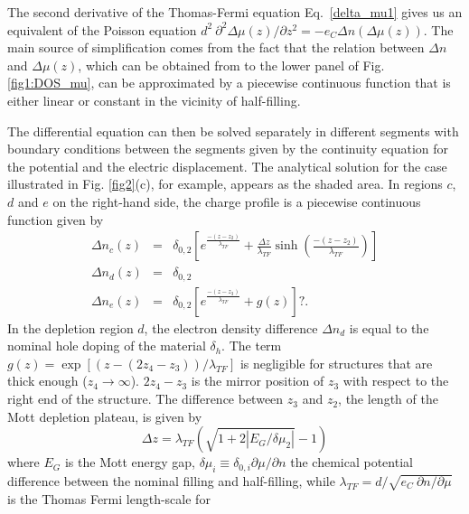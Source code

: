 \documentclass[twocolumn, preprintnumbers,prb,aps,amssymb,showpacs]{revtex4}
\begin{document}
The second derivative of the Thomas-Fermi equation Eq.~\eqref{delta_mu1} gives us an equivalent of the Poisson equation $d^2~ \partial ^{2}\Delta \mu \left( z\right) / \partial z^{2} = - e_{C} \Delta n\left( \Delta \mu \left( z\right) \right)$. The main source of simplification comes from the fact that the relation between $\Delta n$
and $ \Delta \mu \left( z\right)$, which can be
obtained from to the lower panel of Fig. \ref{fig1:DOS_mu}, can be
approximated by a piecewise continuous function that is either linear or constant in the vicinity of half-filling. 

The differential equation can then be solved separately in different segments with boundary conditions between the segments given by the
continuity equation for the potential and the electric displacement. The
analytical solution for the case illustrated in Fig. \ref{fig2}(c), for example, appears as the shaded area.
In regions $c$, $d$ and $e$ on the right-hand side, the charge profile is a piecewise continuous function given by
\begin{eqnarray}
\Delta n_{c}\left( z\right)  &=&\delta_{0,2}\left[ e^{\frac{-\left(
z-z_{2}\right)}{\lambda _{TF}} }+\frac{\Delta z}{\lambda _{TF}}\sinh \left( \frac{-\left(
z-z_{2}\right)}{\lambda _{TF}}
\right) \right]    \nonumber \\
\Delta n_{d}\left( z\right) &=&\delta_{0,2}  \nonumber\\
\Delta n_{e}\left( z\right)  &=&\delta_{0,2}\left[ e^{\frac{-\left(
z-z_{3}\right)}{\lambda _{TF}} }+g\left( z\right) \right]?.   \label{profile3}
\end{eqnarray}%
In the depletion region $d$, the electron density difference $\Delta n_{d}$ is equal to the nominal hole doping of the material $\delta_{h}$. The term $g\left( z\right) =\exp \left[ \left( z-\left(
2z_{4}-z_{3}\right) \right) /\lambda _{TF}\right] $ is negligible for
structures that are thick enough ($z_{4}\rightarrow \infty $). $2z_{4}-z_{3}$
is the mirror position of $z_{3}$ with respect to the right end of the structure.
The difference between $z_{3}$ and $z_{2}$, the length of the Mott depletion
plateau, is given by
\begin{equation}
\Delta z=\lambda _{TF}(\sqrt{1+2\left\vert E_G/\delta \mu
_{2}\right\vert }-1)  \label{delta_z}
\end{equation}%
where $E_G$ is the Mott energy gap, $\delta \mu _{i} \equiv \delta_{0,i}\partial \mu/\partial n $ the chemical potential difference between the nominal filling and half-filling, while $\lambda _{TF}=d/\sqrt{e_{C}~\partial n/\partial \mu}$ is the Thomas Fermi length-scale for
\end{document}
